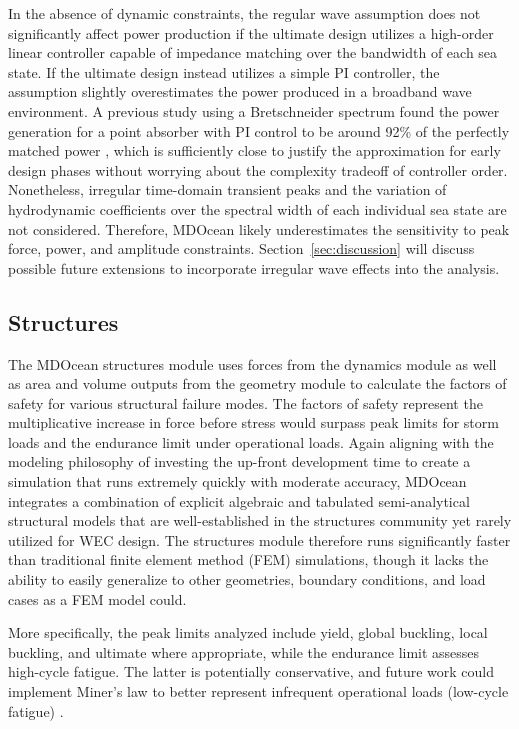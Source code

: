 In the absence of dynamic constraints, the regular wave assumption does not significantly affect power production if the ultimate design utilizes a high-order linear controller capable of impedance matching over the bandwidth of each sea state.
If the ultimate design instead utilizes a simple PI controller, the assumption slightly overestimates the power produced in a broadband wave environment.
A previous study using a Bretschneider spectrum found the power generation for a point absorber with PI control to be around 92\% of the perfectly matched power \cite{coe_practical_2021}, which is sufficiently close to justify the approximation for early design phases without worrying about the complexity tradeoff of controller order.
Nonetheless, irregular time-domain transient peaks and the variation of hydrodynamic coefficients over the spectral width of each individual sea state are not considered.
Therefore, MDOcean likely underestimates the sensitivity to peak force, power, and amplitude constraints.
Section~\ref{sec:discussion} will discuss possible future extensions to incorporate irregular wave effects into the analysis.

\subsection{Structures}\label{sec:structures}
The MDOcean structures module uses forces from the dynamics module as well as area and volume outputs from the geometry module to calculate the factors of safety for various structural failure modes.
The factors of safety represent the multiplicative increase in force before stress would surpass peak limits for storm loads and the endurance limit under operational loads.
Again aligning with the modeling philosophy of investing the up-front development time to create a simulation that runs extremely quickly with moderate accuracy, MDOcean integrates a combination of explicit algebraic and tabulated semi-analytical structural models that are well-established in the structures community yet rarely utilized for WEC design.
The structures module therefore runs significantly faster than traditional finite element method (FEM) simulations, though it lacks the ability to easily generalize to other geometries, boundary conditions, and load cases as a FEM model could. 

More specifically, the peak limits analyzed include yield, global buckling, local buckling, and ultimate where appropriate, while the endurance limit assesses high-cycle fatigue.
The latter is potentially conservative, and future work could implement Miner's law to better represent infrequent operational loads (low-cycle fatigue) \cite{ove_arup__partners_ltd_structural_2016}. 

